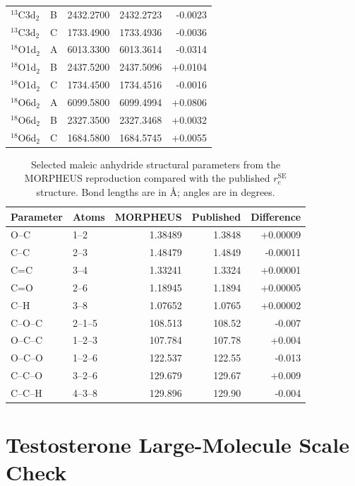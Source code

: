 \documentclass[12pt]{article}
\begin{document}
\begin{longtable}{llrrr}
$^{13}$C3d$_2$ & B & 2432.2700 & 2432.2723 & -0.0023 \\
$^{13}$C3d$_2$ & C & 1733.4900 & 1733.4936 & -0.0036 \\
$^{18}$O1d$_2$ & A & 6013.3300 & 6013.3614 & -0.0314 \\
$^{18}$O1d$_2$ & B & 2437.5200 & 2437.5096 & +0.0104 \\
$^{18}$O1d$_2$ & C & 1734.4500 & 1734.4516 & -0.0016 \\
$^{18}$O6d$_2$ & A & 6099.5800 & 6099.4994 & +0.0806 \\
$^{18}$O6d$_2$ & B & 2327.3500 & 2327.3468 & +0.0032 \\
$^{18}$O6d$_2$ & C & 1684.5800 & 1684.5745 & +0.0055 \\
\bottomrule
\end{longtable}

\begin{table}
\caption{Selected maleic anhydride structural parameters from the MORPHEUS
reproduction compared with the published $r_e^\mathrm{SE}$ structure. Bond
lengths are in \AA; angles are in degrees.}
\label{tab:si-maleic-geometry}
\begin{tabular}{llrrr}
\toprule
Parameter & Atoms & MORPHEUS & Published & Difference \\
\midrule
O--C & 1--2 & 1.38489 & 1.3848 & +0.00009 \\
C--C & 2--3 & 1.48479 & 1.4849 & -0.00011 \\
C=C & 3--4 & 1.33241 & 1.3324 & +0.00001 \\
C=O & 2--6 & 1.18945 & 1.1894 & +0.00005 \\
C--H & 3--8 & 1.07652 & 1.0765 & +0.00002 \\
C--O--C & 2--1--5 & 108.513 & 108.52 & -0.007 \\
O--C--C & 1--2--3 & 107.784 & 107.78 & +0.004 \\
O--C--O & 1--2--6 & 122.537 & 122.55 & -0.013 \\
C--C--O & 3--2--6 & 129.679 & 129.67 & +0.009 \\
C--C--H & 4--3--8 & 129.896 & 129.90 & -0.004 \\
\bottomrule
\end{tabular}
\end{table}

\section{Testosterone Large-Molecule Scale Check}
\end{document}
